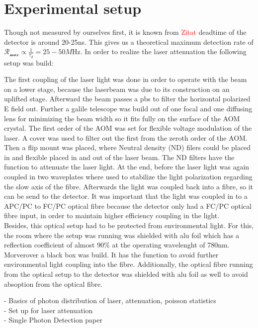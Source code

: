 \section{Experimental setup}

Though not measured by ourselves first, it is known from \textcolor{red}{Zitat} deadtime of the detector is around 20-25ns.
This gives us a theoretical maximum detection rate of $\mathcal{R_{\max}} \propto \frac{1}{\tau_{d}} = 25-50\si{M\Hz}$.
In order to realize the laser attenuation the following setup was build:

The first coupling of the laser light was done in order to operate with the beam on a lower stage, because the laserbeam 
was due to its construction on an uplifted stage. 
Afterward the beam passes a pbs to filter the horizontal polarized E field out. 
Further a galile telescope was build out of one focal and one diffusing lens for minimizing the beam width so it fits fully 
on the surface of the AOM crystal. The first order of the AOM was set for flexible voltage modulation of the laser.
A cover was used to filter out the first from the zeroth order of the AOM. Then a flip mount was placed, where 
Neutral density (ND) filers could be placed in and flexible placed in and out of the laser beam. 
The ND filters have the function to attenuate the laser light. 
At the end, before the laser light was again coupled in two waveplates where used to stabilize the light polarization regarding the
slow axis of the fibre. Afterwards the light was coupled back into a fibre, so it can be send to the detector.
It was important that the light was coupled in to a APC/PC to FC/PC optical fibre because the detector only had a FC/PC optical fibre
input, in order to maintain higher efficiency coupling in the light.\\

Besides, this optical setup had to be protected from environmental light. For this, the room where the setup was running was shielded 
with alu foil which has a reflection coefficient of almost 90$\%$ at the operating wavelenght of 780nm. 
Morverover a black box was build. It has the function to avoid further environmental light coupling into the fibre. Additionally, 
the optical fibre running from the optical setup to the detector was shielded with alu foil as well to avoid absoption from the optical 
fibre. 




- Basics of photon distribution of laser, attenuation, poisson statistics \\
- Set up for laser attenuation \\
- Single Photon Detection paper \\



